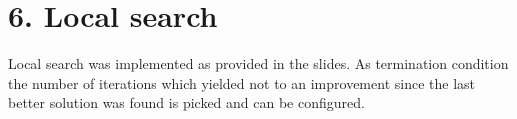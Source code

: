 \section*{6. Local search}
Local search was implemented as provided in the slides. As termination condition the number of iterations which yielded not to an improvement since the last better solution was found is picked and can be configured.